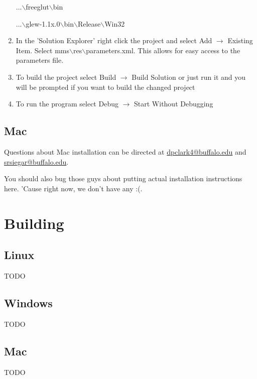 \documentclass[12pt]{article}
\begin{document}
\begin{enumerate}
    ...$\backslash$freeglut$\backslash$bin

    ...$\backslash$glew-1.1x.0$\backslash$bin$\backslash$Release$\backslash$Win32
    
\item In the 'Solution Explorer' right click the project and select Add
$\rightarrow$ Existing Item.  Select
mms$\backslash$res$\backslash$parameters.xml.  This allows for easy access to
the parameters file.

\item To build the project select Build $\rightarrow$ Build Solution or just run it and
you will be prompted if you want to build the changed project

\item To run the program select Debug $\rightarrow$ Start Without Debugging

\end{enumerate}


\subsection{Mac}

Questions about Mac installation can be directed at \url{dpclark4@buffalo.edu}
and \url{srsiegar@buffalo.edu}.

You should also bug those guys about putting actual installation instructions
here. 'Cause right now, we don't have any :(.


\section{Building}

\subsection{Linux}
TODO

\subsection{Windows}
TODO

\subsection{Mac}
TODO
\end{document}

